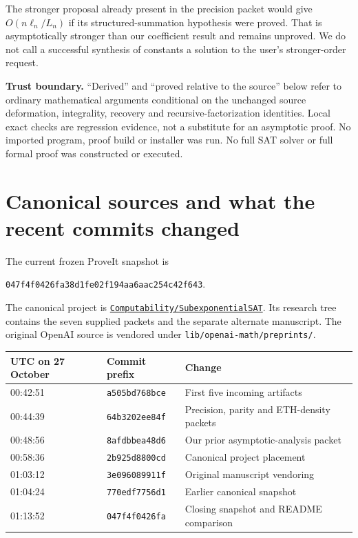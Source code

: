 \documentclass[11pt,letterpaper]{article}
\newcommand{\pin}{\texttt{047f4f0426fa38d1fe02f194aa6aac254c42f643}}
\begin{document}
The stronger proposal already present in the precision packet would give
$O(n\ell_n/L_n)$ if its structured-summation hypothesis were proved.
That is asymptotically stronger than our coefficient result and remains unproved.
We do not call a successful synthesis of constants a solution to the user's stronger-order request.

\textbf{Trust boundary.} ``Derived'' and ``proved relative to the source'' below refer to
ordinary mathematical arguments conditional on the unchanged source deformation, integrality,
recovery and recursive-factorization identities. Local exact checks are regression evidence,
not a substitute for an asymptotic proof. No imported program, proof build or installer was run.
No full SAT solver or full formal proof was constructed or executed.

\section{Canonical sources and what the recent commits changed}
The current frozen ProveIt snapshot is
\begin{center}\small\pin.\end{center}
The canonical project is
\href{https://github.com/VladimirReshetnikov/ProveIt/tree/047f4f0426fa38d1fe02f194aa6aac254c42f643/Computability/SubexponentialSAT}{\texttt{Computability/SubexponentialSAT}}.
Its research tree contains the seven supplied packets and the separate alternate manuscript.
The original OpenAI source is vendored under \texttt{lib/openai-math/preprints/}.

\begin{center}\small
\begin{tabular}{@{}lll@{}}\toprule
UTC on 27 October & Commit prefix & Change\\\midrule
00:42:51 & \texttt{a505bd768bce} & First five incoming artifacts\\
00:44:39 & \texttt{64b3202ee84f} & Precision, parity and ETH-density packets\\
00:48:56 & \texttt{8afdbbea48d6} & Our prior asymptotic-analysis packet\\
00:58:36 & \texttt{2b925d8800cd} & Canonical project placement\\
01:03:12 & \texttt{3e096089911f} & Original manuscript vendoring\\
01:04:24 & \texttt{770edf7756d1} & Earlier canonical snapshot\\
01:13:52 & \texttt{047f4f0426fa} & Closing snapshot and README comparison\\\bottomrule
\end{tabular}
\end{center}
\end{document}
